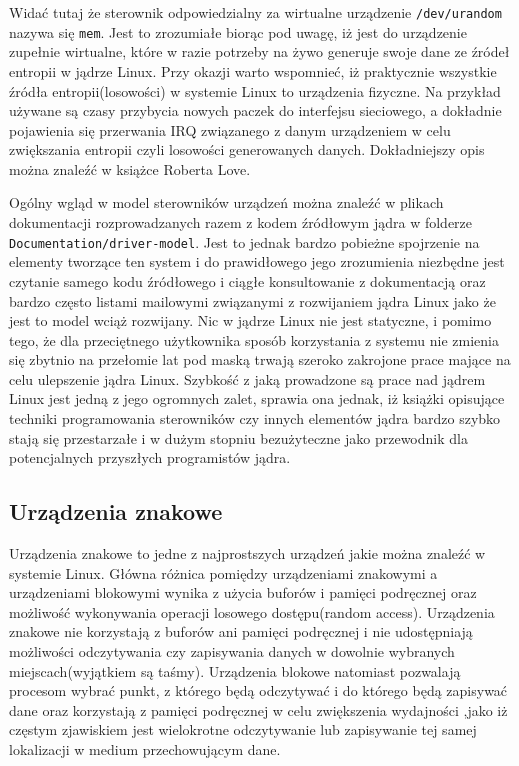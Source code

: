 \documentclass[10pt]{article}
\begin{document}
Widać tutaj że sterownik odpowiedzialny za wirtualne urządzenie
\texttt{/dev/urandom} nazywa się \texttt{mem}. Jest to zrozumiałe biorąc
pod uwagę, iż jest do urządzenie zupełnie wirtualne, które w razie
potrzeby na żywo generuje swoje dane ze źródeł entropii w jądrze Linux.
Przy okazji warto wspomnieć, iż praktycznie wszystkie źródła
entropii(losowości) w systemie Linux to urządzenia fizyczne. Na przykład
używane są czasy przybycia nowych paczek do interfejsu sieciowego, a
dokładnie pojawienia się przerwania IRQ związanego z danym urządzeniem w
celu zwiększania entropii czyli losowości generowanych danych.
Dokładniejszy opis można znaleźć w książce Roberta Love\cite{kerneldevelguide}.

Ogólny wgląd w model sterowników urządzeń można znaleźć w plikach
dokumentacji rozprowadzanych razem z kodem źródłowym jądra w folderze
\texttt{Documentation/driver-model}. Jest to jednak bardzo pobieżne
spojrzenie na elementy tworzące ten system i do prawidłowego jego
zrozumienia niezbędne jest czytanie samego kodu źródłowego i ciągłe
konsultowanie z dokumentacją oraz bardzo często listami mailowymi
związanymi z rozwijaniem jądra Linux jako że jest to model wciąż
rozwijany. Nic w jądrze Linux nie jest statyczne, i pomimo tego, że dla
przeciętnego użytkownika sposób korzystania z systemu nie zmienia się
zbytnio na przełomie lat pod maską trwają szeroko zakrojone prace mające
na celu ulepszenie jądra Linux. Szybkość z jaką prowadzone są prace nad
jądrem Linux jest jedną z jego ogromnych zalet, sprawia ona jednak, iż
książki opisujące techniki programowania sterowników czy innych
elementów jądra bardzo szybko stają się przestarzałe i w dużym stopniu
bezużyteczne jako przewodnik dla potencjalnych przyszłych programistów
jądra.

\subsection{Urządzenia znakowe}
\label{chardevs}

Urządzenia znakowe to jedne z najprostszych urządzeń jakie można znaleźć
w systemie Linux. Główna różnica pomiędzy urządzeniami znakowymi a
urządzeniami blokowymi wynika z użycia buforów i pamięci podręcznej oraz
możliwość wykonywania operacji losowego dostępu(random access).
Urządzenia znakowe nie korzystają z buforów ani pamięci podręcznej i nie
udostępniają możliwości odczytywania czy zapisywania danych w dowolnie
wybranych miejscach(wyjątkiem są taśmy). Urządzenia blokowe natomiast
pozwalają procesom wybrać punkt, z którego będą odczytywać i do którego
będą zapisywać dane oraz korzystają z pamięci podręcznej w celu
zwiększenia wydajności ,jako iż częstym zjawiskiem jest wielokrotne
odczytywanie lub zapisywanie tej samej lokalizacji w medium
przechowującym dane.
\end{document}
